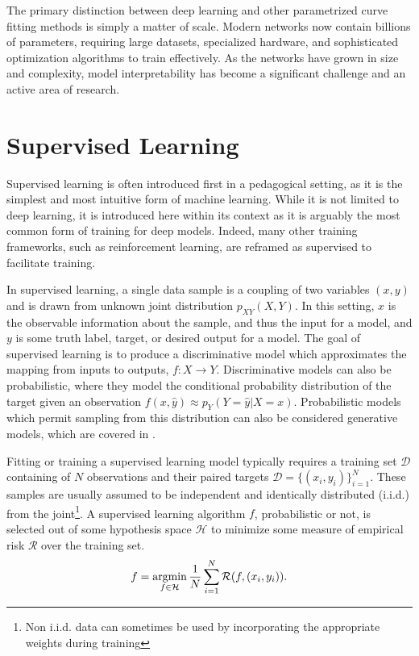 The primary distinction between deep learning and other parametrized curve fitting methods is simply a matter of scale.
Modern networks now contain billions of parameters, requiring large datasets, specialized hardware, and sophisticated optimization algorithms to train effectively.
As the networks have grown in size and complexity, model interpretability has become a significant challenge and an active area of research.

\section{Supervised Learning}
\label{sec:supervised_learning}

Supervised learning is often introduced first in a pedagogical setting, as it is the simplest and most intuitive form of machine learning. While it is not limited to deep learning, it is introduced here within its context as it is arguably the most common form of training for deep models. Indeed, many other training frameworks, such as reinforcement learning, are reframed as supervised to facilitate training.

In supervised learning, a single data sample is a coupling of two variables $(x, y)$ and is drawn from unknown joint distribution $p_{XY}(X, Y)$.
In this setting, $x$ is the observable information about the sample, and thus the input for a model, and $y$ is some truth label, target, or desired output for a model.
The goal of supervised learning is to produce a discriminative model which approximates the mapping from inputs to outputs, $f: X \rightarrow Y$.
Discriminative models can also be probabilistic, where they model the conditional probability distribution of the target given an observation $f(x, \hat y) \approx p_Y(Y=\hat y|X=x)$.
Probabilistic models which permit sampling from this distribution can also be considered generative models, which are covered in .

Fitting or training a supervised learning model typically requires a training set $\mathcal{D}$ containing of $N$ observations and their paired targets $\mathcal{D} = \{(x_i, y_i)\}_{i=1}^N$.
These samples are usually assumed to be independent and identically distributed (i.i.d.) from the joint\footnote{Non i.i.d. data can sometimes be used by incorporating the appropriate weights during training}.
A supervised learning algorithm $f$, probabilistic or not, is selected out of some hypothesis space $\mathcal{H}$ to minimize some measure of empirical risk $\mathcal{R}$ over the training set.
\begin{equation}
    f = \operatorname*{argmin}_{f \in \mathcal{H}} \frac{1}{N} \sum_{i=1}^N \mathcal{R}(f, (x_i, y_i)).
\end{equation}

